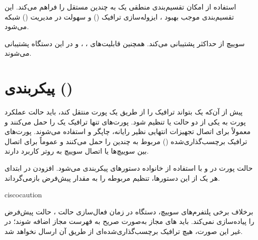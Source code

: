 \documentclass[11pt,letterpaper]{report}
\newenvironment{cautionbox}[1]{%
	\begin{noticebox}[title={\textbf{\faExclamationTriangle\ #1}}]{ciscocaution}
	}{%
	\end{noticebox}
}
\begin{document}
	استفاده از  امکان تقسیم‌بندی منطقی یک
	 به چندین  مستقل را فراهم
	می‌کند. این تقسیم‌بندی موجب بهبود ،
	ایزوله‌سازی ترافیک () و سهولت در مدیریت
	() شبکه می‌شود.

	سوییچ  از حداکثر
	 پشتیبانی می‌کند. همچنین قابلیت‌های
	، ، 
	و  در این دستگاه پشتیبانی می‌شوند.

	\section{پیکربندی  ()}
	\label{sec:port-modes}

	پیش از آن‌که یک  بتواند ترافیک را از طریق یک پورت منتقل کند،
	باید حالت عملکرد پورت به یکی از دو حالت  یا 
	تنظیم شود. پورت‌های  تنها ترافیک یک  را حمل
	می‌کنند و معمولاً برای اتصال تجهیزات انتهایی نظیر رایانه، چاپگر و
	 استفاده می‌شوند. پورت‌های  ترافیک برچسب‌گذاری‌شده
	() مربوط به چندین  را حمل می‌کنند و
	عموماً برای اتصال بین سوییچ‌ها یا اتصال سوییچ به روتر کاربرد دارند.

	حالت پورت در  و با استفاده از
	خانواده دستورهای  پیکربندی می‌شود. افزودن
	 در ابتدای هر یک از این دستورها، تنظیم مربوطه را به
	مقدار پیش‌فرض بازمی‌گرداند.

	\begin{cautionbox}{\lr{Caution}}
		برخلاف برخی پلتفرم‌های سوییچ، دستگاه  در زمان فعال‌سازی
		حالت ، حالت پیش‌فرض  را پیاده‌سازی
		نمی‌کند. باید های مجاز به‌صورت صریح به فهرست مجاز
		 اضافه شوند؛ در غیر این صورت، هیچ ترافیک برچسب‌گذاری‌شده‌ای
		از طریق آن  ارسال نخواهد شد.
	\end{cautionbox}
\end{document}
